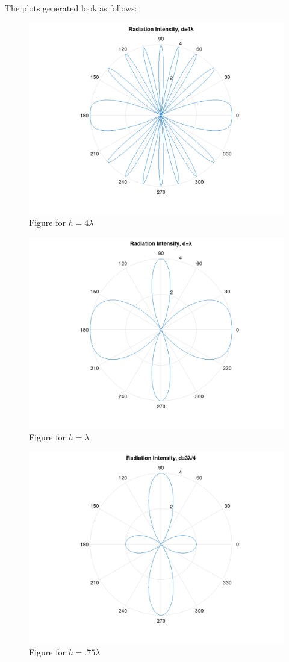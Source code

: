 \begin{enumerate}
\begin{enumerate}
        The plots generated look as follows:

        \begin{figure}[H] \centering
          \includegraphics[width=.7\textwidth]{Figures/4lambda.png}
          \caption{Figure for $h=4\lambda$}
          \label{fig:1}
        \end{figure}

        \begin{figure}[H]
          \centering
          \includegraphics[width=.7\textwidth]{Figures/lambda.png}
          \caption{Figure for $h=\lambda$}
          \label{fig:2}
        \end{figure}

        \begin{figure}[H]
          \centering
          \includegraphics[width=.7\textwidth]{Figures/3lambda-4.png}
          \caption{Figure for $h=.75\lambda$}
          \label{fig:3}
        \end{figure}


\end{enumerate}
\end{enumerate}
